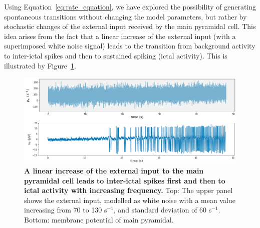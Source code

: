 \documentclass[11pt,a4,oneside]{amsart}
\begin{document}
Using Equation~\ref{eq:rate_equation}, we have explored the possibility of generating spontaneous transitions without changing the model parameters, but rather by stochastic changes of the external input received by the main pyramidal cell. This idea arises from the fact that a linear increase of the external input (with a superimposed white noise signal) leads to the transition from background activity to inter-ictal spikes and then to sustained spiking (ictal activity). This is illustrated by Figure~\ref{fig:linear}.

\begin{figure}[hbtp!]
    \centering
    \includegraphics[width=15cm]{figures/Linear.png}
    \caption{{\bf A linear increase of the external input to the main pyramidal cell leads to inter-ictal spikes first and then to ictal activity with increasing frequency.} Top: The upper panel shows the external input, modelled as white noise with a mean value increasing from 70 to 130 s$^{-1}$, and standard deviation of 60 s$^{-1}$. Bottom:  membrane potential of main pyramidal.}
    \label{fig:linear}
\end{figure}
\end{document}
